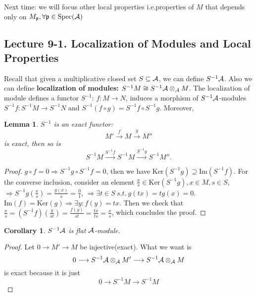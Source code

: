 \documentclass[11pt]{article}
\newtheorem{lemma}[thm]{Lemma}
\newtheorem{cor}[thm]{Corollary}
\newcommand{\scp}{{\mathfrak p}}
\newcommand{\cala}{{\cal A}}
\newcommand{\Lrta}{\Longrightarrow}
\newcommand{\lrta}{\longrightarrow}
\begin{document}
Next time: we will focus other local properties i.e.properties of $M$ that depends only on  $M_\scp, \forall \scp\in \text{Spec}(\cala)$



\subsection{Lecture 9-1. Localization of Modules and Local Properties}
Recall that given a multiplicative closed set 
$S\subseteq \cala$, we can define  $S^{-1}\cala$.
Also we can define \textbf{localization of modules:} $S^{-1}M\cong S^{-1}\cala\otimes_\cala M$. The localization of module defines a functor $S^{-1}$:
$f:M\lrta N$, induces a morphism of $S^{-1}\cala$-modules $S^{-1}f:S^{-1}M\lrta S^{-1}N$ and $S^{-1}(f\circ g)=S^{-1}f\circ S^{-1}g$. Moreover,
\begin{lemma} $S^{-1}$ is an exact functor:
$$
M'\overset{f}{\lrta}M\overset{g}{\lrta}M''
$$
is exact, then so is 
$$
S^{-1}M\overset{S^{-1}f}{\lrta }S^{-1}M\overset{S^{-1}g}{\lrta } S^{-1}M''.
$$
\end{lemma}
\begin{proof}
$g\circ f=0\Lrta S^{-1}g\circ S^{-1}f=0$, then we have $\text{Ker}(S^{-1}g)\supseteq \text{Im}(S^{-1}f)$. For the converse inclusion, consider an element $\frac{x}{s}\in \text{Ker}(S^{-1}g), x\in M, s\in S$, $\Lrta S^{-1}g(\frac{x}{s})=\frac{g(x)}{s}=\frac{0}{1}$, $\Lrta \exists t\in S\ s.t. \ g(tx)=tg(x)=0$. $\text{Im}(f)=\text{Ker}(g)\Lrta\exists y: f(y)=tx$. Then we check that $\frac{x}{s}=(S^{-1}f)(\frac{y}{st})=\frac{f(y)}{st}=\frac{tx}{ts}=\frac{x}{s}$, which concludes the proof.
\end{proof}

\begin{cor}
$S^{-1}\cala$ is flat $\cala$-module.
\end{cor}
\begin{proof}
Let $0\lrta M'\lrta M$ be injective(exact). What we want is 
$$
0\lrta S^{-1}\cala\otimes_\cala M'\lrta S^{-1
}\cala\otimes _\cala M
$$
is exact because it is just 
$$
0\lrta S^{-1}M\lrta S^{-1}M
$$
\end{proof}
\end{document}
